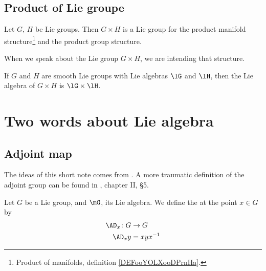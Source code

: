 \subsection{Product of Lie groupe}

\begin{propositionDef}      \label{PROPooKENCooMKJJjV}
    Let \( G\), \( H\) be Lie groups. Then \( G\times H\) is a Lie group for the product manifold structure\footnote{Product of manifolds, definition \ref{DEFooYOLXooDPrnHa}.} and the product group structure.

    When we speak about the Lie group \( G\times H\), we are intending that structure.
\end{propositionDef}

\begin{proposition}     \label{PROPooKITOooTcsIiu}
    If \( G\) and \( H\) are smooth Lie groups with Lie algebras \( \lG\) and \( \lH\), then the Lie algebra of \( G\times H\) is \( \lG\times \lH\).
\end{proposition}

\section{Two words about Lie algebra}


\subsection{Adjoint map}

The ideas of this short note comes from \cite{Lie}. A more traumatic definition of the adjoint group can be found in \cite{Helgason}, chapter II, \S 5. 

\begin{definition}
    Let $G$ be a Lie group, and $\mG$, its Lie algebra. We define the  at the point $x\in G$ by
    \begin{equation}
        \begin{aligned}
            \AD_x\colon G&\to G \\
            \AD_xy&=xyx^{-1}
        \end{aligned}
    \end{equation}
\end{definition}

